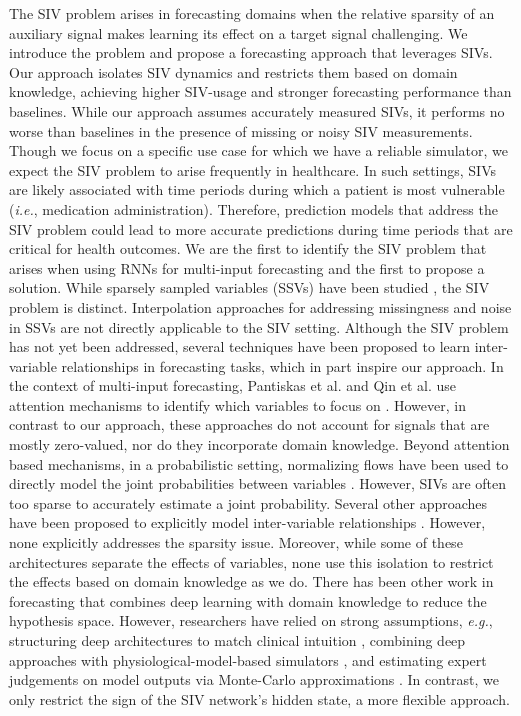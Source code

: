 \documentclass[letterpaper]{article}
\begin{document}
The SIV problem arises in forecasting domains when the relative sparsity of an auxiliary signal makes learning its effect on a target signal challenging. We introduce the problem and propose a forecasting approach that leverages SIVs. Our approach isolates SIV dynamics and restricts them based on domain knowledge, achieving higher SIV-usage and stronger forecasting performance than baselines. While our approach assumes accurately measured SIVs, it performs no worse than baselines in the presence of missing or noisy SIV measurements. Though we focus on a specific use case for which we have a reliable simulator, we expect the SIV problem to arise frequently in healthcare. In such settings, SIVs are likely associated with time periods during which a patient is most vulnerable (\textit{i.e.}, medication administration). Therefore, prediction models that address the SIV problem could lead to more accurate predictions during time periods that are critical for health outcomes.  We are the first to identify the SIV problem that arises when using RNNs for multi-input forecasting and the first to propose a solution. While sparsely sampled variables (SSVs) have been studied \cite{missing}, the SIV problem is distinct. Interpolation approaches for addressing missingness and noise in SSVs are not directly applicable to the SIV setting. Although the SIV problem has not yet been addressed, several techniques have been proposed to learn inter-variable relationships in forecasting tasks, which in part inspire our approach. In the context of multi-input forecasting, Pantiskas et al. and Qin et al. use attention mechanisms to identify which variables to focus on \cite{attention1,cnnandatten}. However, in contrast to our approach, these approaches do not account for signals that are mostly zero-valued, nor do they incorporate domain knowledge. Beyond attention based mechanisms, in a probabilistic setting, normalizing flows have been used to directly model the joint probabilities between variables \cite{prob1,prob2}. However, SIVs are often too sparse to accurately estimate a joint probability. Several other approaches have been proposed to explicitly model inter-variable relationships \cite{cnn1,cnn2,cnnandatten,graphresid,sharedmulti}. However, none explicitly addresses the sparsity issue. Moreover, while some of these architectures separate the effects of variables, none use this isolation to restrict the effects based on domain knowledge as we do. There has been other work in forecasting that combines deep learning with domain knowledge to reduce the hypothesis space. However, researchers have relied on strong assumptions, \textit{e.g.}, structuring deep architectures to match clinical intuition \cite{gluexps}, combining deep approaches with physiological-model-based simulators \cite{wild}, and estimating expert judgements on model outputs via Monte-Carlo approximations \cite{domain}. In contrast, we only restrict the sign of the SIV network's hidden state, a more flexible approach.
\end{document}
